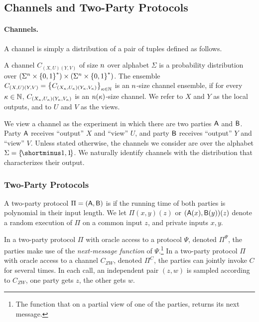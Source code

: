 \subsection{Channels and Two-Party Protocols}\label{sec:protocol}

\paragraph{Channels.}A channel is simply a distribution of a pair of tuples defined as follows. 
\begin{definition}[Channels]\label{def:channel} A {\sf channel} $C_{(X,U)(Y,V)}$ of size $n$ over alphabet $\Sigma$ is a probability distribution over $(\Sigma^\isize \times\zo^\ast) \times(\Sigma^\isize \times\zo^\ast)$. The ensemble $C_{(X,U)(Y,V)}= \set{C_{(X_\pk,U_\pk)(Y_\pk,V_\pk)}}_{\pk\in \N}$ is an $n$-size channel ensemble, if for every $\kappa\in {\mathbb{N}}$, $C_{(X_\kappa,U_\kappa)(Y_\kappa,V_\kappa)}$ is an $n(\kappa)$-size channel. %
We refer to $X$ and $Y$ as the {\sf local outputs}, and to $U$ and $V$ as the {\sf views}.	
\end{definition}

We view a  channel as the experiment in which there are two parties $\mathsf{A}$ and $\mathsf{B}$.  Party $\mathsf{A}$ receives ``output'' $X$ and ``view'' $U$, and party $\mathsf{B}$ receives ``output'' $Y$ and ``view'' $V$. Unless stated otherwise, the channels we consider are over the alphabet $\Sigma = \oo$. We naturally identify channels with the distribution that characterizes their output.








\subsubsection{Two-Party Protocols}

A two-party protocol $\Pi=(\mathsf{A},\mathsf{B})$ is \ppt if the running time of both parties is polynomial in their input length. We let $\Pi(x,y)(z)$ or $(\mathsf{A}(x),\mathsf{B}(y))(z)$ denote a random execution of $\Pi$ on a common input $z$, and private inputs $x,y$.%

\begin{definition}\label{def:ChannelAidedProtocol}
	In a two-party protocol $\Pi$ with oracle access to a {\sf protocol} $\Psi$, denoted $\Pi^\Psi$, the parties make use of the \textit{next-message function} of $\Psi$.\footnote{The function that on a partial view of one of the parties, returns its next message.} In a two-party protocol $\Pi$ with oracle access to a {\sf channel} $C_{Z W}$, denoted $\Pi^C$, the parties can jointly invoke $C$ for several times. In each call, an independent pair $(z,w)$ is sampled according to $C_{Z W}$, one party gets $z$, the other gets $w$.
\end{definition}


